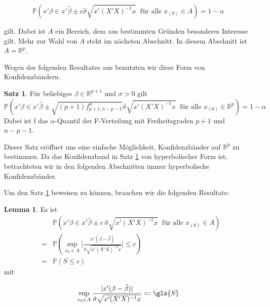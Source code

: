 \documentclass[12pt,a4paper]{article}
\theoremstyle{definition}
\theoremstyle{definition}
\newtheorem{Satz}[Definition]{Satz}
\theoremstyle{definition}
\theoremstyle{definition}
\newtheorem{Lemma}[Definition]{Lemma}
\begin{document}
\begin{equation*}
\mathbb{P} \left( x' \beta \in x'\hat{\beta} \pm c \hat{\sigma}\sqrt{x'(X'X)^{-1}x} ~ \text{ für alle } x_{(0)} \in A \right) = 1-\alpha
\end{equation*}

gilt. Dabei ist $A$ ein Bereich, dem aus bestimmten Gründen besonderes Interesse gilt. Mehr zur Wahl von $A$ steht im nächsten Abschnitt. In diesem Abschnitt ist $A = \mathbb{R}^p$.

Wegen des folgenden Resultates aus \cite[66]{Liu64} benutzten wir diese Form von Konfidenzbändern.

\begin{Satz} \label{KB_Eigenschaft}
Für beliebiges $\beta \in \mathbb{R}^{p+1}$ und $\sigma > 0$ gilt 
\begin{equation*}
\mathbb{P} \left( x'\beta \in x' \hat{\beta} \pm \sqrt{(p+1) f^{\alpha}_{p+1,n-p-1}} \hat{\sigma} \sqrt{x' (X'X)^{-1}x} ~ \text{ für alle } x_{(0)} \in \mathbb{R}^p \right) = 1 - \alpha
\end{equation*}
Dabei ist \gls{f} das $\alpha$-Quantil der F-Verteilung mit Freiheitsgraden $p+1$ und $n-p-1$.
\end{Satz} 

Dieser Satz eröffnet uns eine einfache Möglichkeit, Konfidenzbänder auf $\mathbb{R}^p$ zu bestimmen. Da das Konfidenzband in Satz \ref{KB_Eigenschaft} von hyperbolischer Form ist, betrachteten wir in den folgenden Abschnitten immer hyperbolische Konfidenzbänder.

Um den Satz \ref{KB_Eigenschaft} beweisen zu können, brauchen wir die folgenden Resultate:

\begin{Lemma} \label{Basiseigenschaft}
Es ist
\begin{eqnarray*}
&&\mathbb{P} \left( x'\beta \in x' \hat{\beta} \pm c ~ \hat{\sigma} \sqrt{x' (X'X)^{-1} x} ~ \text{ für alle } x_{(0)} \in A \right) \\
&=& \mathbb{P} \left( \sup_{ x_{0} \in A} \bigg \vert \frac{x'(\beta - \hat{\beta})}{\hat{\sigma} \sqrt{x'(X'X)^{-1}x}} \bigg \vert \leq c \right) \\
&=& \mathbb{P}( S \leq c)
\end{eqnarray*}
mit 

\begin{equation*}
\sup_{x_{0} \in A} \frac{\vert x'(\beta - \hat{\beta}) \vert}{\hat{\sigma} \sqrt{x'(X'X)^{-1}x}}  =:  \gls{S}
\end{equation*}

\end{Lemma}
\end{document}
